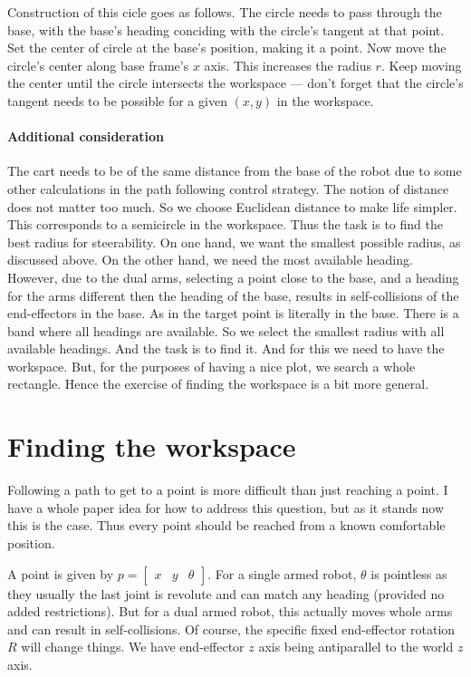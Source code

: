 \documentclass{article}
\begin{document}
Construction of this cicle goes as follows.
The circle needs to pass through the base, with the base's heading
conciding with the circle's tangent at that point.
Set the center of circle at the base's position, making it a point.
Now move the circle's center along base frame's $x$ axis.
This increases the radius $r$. 
Keep moving the center until the circle intersects the 
workspace --- don't forget that the circle's tangent
needs to be possible for a given $(x,y)$ in the workspace.

\paragraph{Additional consideration}
The cart needs to be of the same distance from the base of the robot
due to some other calculations in the path following control strategy.
The notion of distance does not matter too much.
So we choose Euclidean distance to make life simpler.
This corresponds to a semicircle in the workspace.
Thus the task is to find the best radius for steerability.
On one hand, we want the smallest possible radius,
as discussed above.
On the other hand, we need the most available heading.
However, due to the dual arms, selecting a point close to the base,
and a heading for the arms different then the heading of the base,
results in self-collisions of the end-effectors in the base.
As in the target point is literally in the base.
There is a band where all headings are available.
So we select the smallest radius with all available headings.
And the task is to find it.
And for this we need to have the workspace.
But, for the purposes of having a nice plot,
we search a whole rectangle.
Hence the exercise of finding the workspace is a bit more general.


\section{Finding the workspace}
Following a path to get to a point is more difficult than just reaching a point.
I have a whole paper idea for how to address this question, but 
as it stands now this is the case.
Thus every point should be reached from a known comfortable position.

A point is given by $p = \begin{bmatrix} x & y & \theta  \end{bmatrix} $.
For a single armed robot, $\theta $ is pointless as they usually the last
joint is revolute and can match any heading (provided no added restrictions).
But for a dual armed robot, this actually moves whole arms and can result in self-collisions.
Of course, the specific fixed end-effector rotation $R$ will change things.
We have end-effector $z$ axis being antiparallel to the world $z$ axis.
\end{document}

